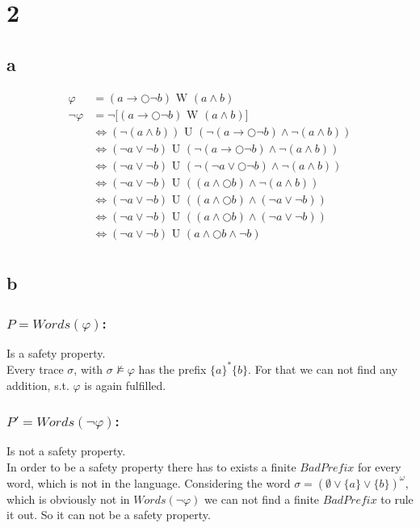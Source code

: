 \documentclass[11pt]{article}
\begin{document}
\section{2}
\subsection{a}

\begin{align*}
\varphi &= (a \rightarrow \bigcirc \lnot b) \text{ W } (a \land b) \\
\lnot\varphi &= \lnot \big[(a \rightarrow \bigcirc \lnot b) \text{ W } (a \land b) \big]\\
&\Leftrightarrow (\lnot(a \land b)) \text{ U } (\lnot(a \rightarrow \bigcirc \lnot b) \land \lnot(a \land b))\\
&\Leftrightarrow (\lnot a \lor \lnot b) \text{ U } (\lnot(a \rightarrow \bigcirc \lnot b) \land \lnot(a \land b)) \\
&\Leftrightarrow (\lnot a \lor \lnot b) \text{ U } (\lnot(\lnot a \lor \bigcirc \lnot b) \land \lnot(a \land b)) \\
&\Leftrightarrow (\lnot a \lor \lnot b) \text{ U } ( (a \land \bigcirc b) \land \lnot(a \land b)) \\
&\Leftrightarrow (\lnot a \lor \lnot b) \text{ U } ( (a \land \bigcirc b) \land (\lnot a \lor \lnot b)) \\
&\Leftrightarrow (\lnot a \lor \lnot b) \text{ U } ( (a \land \bigcirc b) \land (\lnot a \lor \lnot b)) \\
&\Leftrightarrow (\lnot a \lor \lnot b) \text{ U } ( a \land \bigcirc b \land \lnot b) \\
\end{align*}

\subsection{b}
\subsubsection*{$P = Words(\varphi)$:}
Is a safety property.\\
Every trace $\sigma$, with $\sigma \not\models \varphi$ has the prefix $\{a\}^*\{b\}$. For that we can not find any addition, s.t. $\varphi$ is again fulfilled.

\subsubsection*{$P' = Words(\lnot\varphi)$:}
Is not a safety property.\\
In order to be a safety property there has to exists a finite $BadPrefix$ for every word, which is not in the language. Considering the word $\sigma = (\emptyset \lor \{a\} \lor \{b\})^\omega$, which is obviously not in $Words(\lnot\varphi)$ we can not find a finite $BadPrefix$ to rule it out. So it can not be a safety property.
\end{document}
